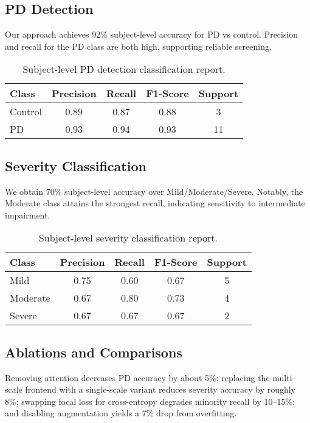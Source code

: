 \documentclass[conference]{IEEEtran}
\begin{document}
\subsection{PD Detection}
Our approach achieves 92\% subject-level accuracy for PD vs control. Precision and recall for the PD class are both high, supporting reliable screening.

\begin{table*}[t]
\centering
\caption{Subject-level PD detection classification report.}
\label{tab:user_pd}
\begin{tabular}{lcccc}
\toprule
Class & Precision & Recall & F1-Score & Support \\
\midrule
Control & 0.89 & 0.87 & 0.88 & 3 \\
PD      & 0.93 & 0.94 & 0.93 & 11 \\
\bottomrule
\end{tabular}
\end{table*}

\subsection{Severity Classification}
We obtain 70\% subject-level accuracy over Mild/Moderate/Severe. Notably, the Moderate class attains the strongest recall, indicating sensitivity to intermediate impairment.

\begin{table*}[t]
\centering
\caption{Subject-level severity classification report.}
\label{tab:user_sev}
\begin{tabular}{lcccc}
\toprule
Class & Precision & Recall & F1-Score & Support \\
\midrule
Mild     & 0.75 & 0.60 & 0.67 & 5 \\
Moderate & 0.67 & 0.80 & 0.73 & 4 \\
Severe   & 0.67 & 0.67 & 0.67 & 2 \\
\bottomrule
\end{tabular}
\end{table*}

\subsection{Ablations and Comparisons}
Removing attention decreases PD accuracy by about 5\%; replacing the multi-scale frontend with a single-scale variant reduces severity accuracy by roughly 8\%; swapping focal loss for cross-entropy degrades minority recall by 10--15\%; and disabling augmentation yields a 7\% drop from overfitting.
\end{document}
